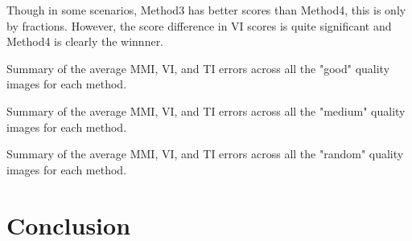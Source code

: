 \documentclass{report}
\begin{document}
	Though in some scenarios, Method3 has better scores than Method4, this is only by fractions. However, the score difference in VI scores is quite significant and Method4 is clearly the winnner.
	
	\begin{table}[h!]
		\centering
		
		\caption{Summary of the average MMI, VI, and TI errors across all the "good" quality images for each method.}
		\label{table:quality_good}
	\end{table}
	
	\begin{table}[h!]
		\centering
		
		\caption{Summary of the average MMI, VI, and TI errors across all the "medium" quality images for each method.}
		\label{table:quality_medium}
	\end{table}
	
	\begin{table}[h]
		\centering
		
		\caption{Summary of the average MMI, VI, and TI errors across all the "random" quality images for each method.}
		\label{table:quality_random}
	\end{table}
	
	\chapter{Conclusion}
	
	\newpage
	\listoffigures
	\listoftables
	\lstlistoflistings %
	
	
	
\end{document}
